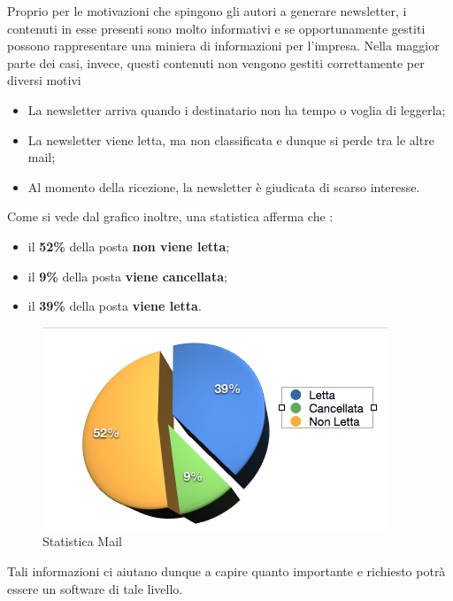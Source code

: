 Proprio per le motivazioni che spingono gli autori a generare newsletter, i contenuti in esse presenti sono molto informativi e se opportunamente gestiti possono rappresentare una miniera di informazioni per l'impresa. Nella maggior parte dei casi, invece, questi contenuti non vengono gestiti correttamente per diversi motivi
\begin{itemize}
\item La newsletter arriva quando i destinatario non ha tempo o voglia di leggerla;
\item La newsletter viene letta, ma non classificata e dunque si perde tra le altre mail;
\item Al momento della ricezione, la newsletter è giudicata di scarso interesse.
\end{itemize}
Come si vede dal grafico inoltre, una statistica afferma che :
\begin{itemize}
\item il \textbf{52\%} della posta \textbf{non viene letta};
\item il \textbf{9\%} della posta \textbf{viene cancellata};
\item il \textbf{39\%} della posta \textbf{viene letta}.
\end{itemize}
\begin{figure}[H]
\centering
\includegraphics[scale=0.75]{img/statistica.png}
\caption{Statistica Mail}
\label{fig:statistica}
\end{figure}
Tali informazioni ci aiutano dunque a capire quanto importante e richiesto potrà essere un software di tale livello.